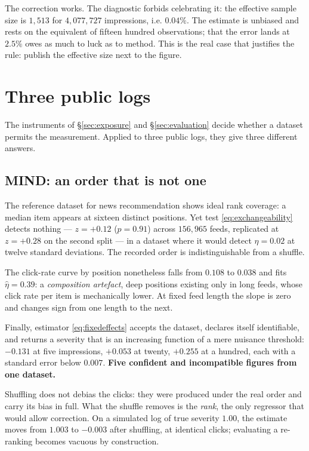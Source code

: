 \documentclass[11pt,a4paper]{article}
\begin{document}
The correction works. The diagnostic forbids celebrating it: the effective sample size is
$1{,}513$ for $4{,}077{,}727$ impressions, i.e. $0.04\%$. The estimate is unbiased and rests on
the equivalent of fifteen hundred observations; that the error lands at $2.5\%$ owes as much to
luck as to method. This is the real case that justifies the rule: publish the effective size
next to the figure.

\section{Three public logs}
\label{sec:logs}

The instruments of \S\ref{sec:exposure} and \S\ref{sec:evaluation} decide whether a dataset
permits the measurement. Applied to three public logs, they give three different answers.

\subsection{MIND: an order that is not one}

The reference dataset for news recommendation \citep{wu2020} shows ideal rank coverage: a median
item appears at sixteen distinct positions. Yet test \eqref{eq:exchangeability} detects nothing
--- $z = +0.12$ ($p = 0.91$) across $156{,}965$ feeds, replicated at $z = +0.28$ on the second
split --- in a dataset where it would detect $\eta = 0.02$ at twelve standard deviations. The
recorded order is indistinguishable from a shuffle.

The click-rate curve by position nonetheless falls from $0.108$ to $0.038$ and fits
$\hat\eta = 0.39$: a \emph{composition artefact}, deep positions existing only in long feeds,
whose click rate per item is mechanically lower. At fixed feed length the slope is zero and
changes sign from one length to the next.

Finally, estimator \eqref{eq:fixedeffects} accepts the dataset, declares itself identifiable,
and returns a severity that is an increasing function of a mere nuisance threshold: $-0.131$ at
five impressions, $+0.053$ at twenty, $+0.255$ at a hundred, each with a standard error below
$0.007$. \textbf{Five confident and incompatible figures from one dataset.}

Shuffling does not debias the clicks: they were produced under the real order and carry its bias
in full. What the shuffle removes is the \emph{rank}, the only regressor that would allow
correction. On a simulated log of true severity $1.00$, the estimate moves from $1.003$ to
$-0.003$ after shuffling, at identical clicks; evaluating a re-ranking becomes vacuous by
construction.
\end{document}
